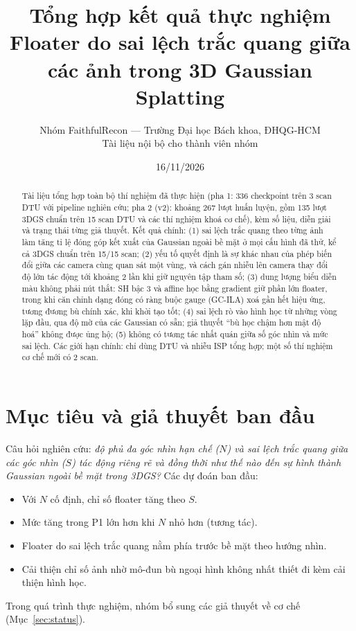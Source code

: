 \documentclass[11pt,a4paper]{article}
\title{\textbf{Tổng hợp kết quả thực nghiệm}\\[3pt]
\large Floater do sai lệch trắc quang giữa các ảnh trong 3D Gaussian Splatting}
\author{Nhóm FaithfulRecon --- Trường Đại học Bách khoa, ĐHQG-HCM\\
Tài liệu nội bộ cho thành viên nhóm}
\date{16/11/2026}
\begin{document}
\maketitle

\begin{abstract}
\noindent Tài liệu tổng hợp toàn bộ thí nghiệm đã thực hiện (pha 1: 336 checkpoint trên 3 scan DTU với pipeline nghiên cứu; pha 2 (v2): khoảng 267 lượt huấn luyện, gồm 135 lượt 3DGS chuẩn trên 15 scan DTU và các thí nghiệm khoá cơ chế), kèm số liệu, diễn giải và trạng thái từng giả thuyết. Kết quả chính: (1) sai lệch trắc quang theo từng ảnh làm tăng tỉ lệ đóng góp kết xuất của Gaussian ngoài bề mặt ở mọi cấu hình đã thử, kể cả 3DGS chuẩn trên 15/15 scan; (2) yếu tố quyết định là sự khác nhau của phép biến đổi giữa các camera cùng quan sát một vùng, và cách gán nhiễu lên camera thay đổi độ lớn tác động tới khoảng 2 lần khi giữ nguyên tập tham số; (3) dung lượng biểu diễn màu không phải nút thắt: SH bậc 3 và affine học bằng gradient giữ phần lớn floater, trong khi căn chỉnh dạng đóng có ràng buộc gauge (GC-ILA) xoá gần hết hiệu ứng, tương đương bù chính xác, khi khởi tạo tốt; (4) sai lệch rò vào hình học từ những vòng lặp đầu, qua độ mờ của các Gaussian có sẵn; giả thuyết ``bù học chậm hơn mật độ hoá'' không được ủng hộ; (5) không có tương tác nhất quán giữa số góc nhìn và mức sai lệch. Các giới hạn chính: chỉ dùng DTU và nhiễu ISP tổng hợp; một số thí nghiệm cơ chế mới có 2 scan.
\end{abstract}

\tableofcontents
\newpage

\section{Mục tiêu và giả thuyết ban đầu}
Câu hỏi nghiên cứu: \emph{độ phủ đa góc nhìn hạn chế ($N$) và sai lệch trắc quang giữa các góc nhìn ($S$) tác động riêng rẽ và đồng thời như thế nào đến sự hình thành Gaussian ngoài bề mặt trong 3DGS?} Các dự đoán ban đầu:
\begin{itemize}
  \item[\textbf{P1.}] Với $N$ cố định, chỉ số floater tăng theo $S$.
  \item[\textbf{P2.}] Mức tăng trong P1 lớn hơn khi $N$ nhỏ hơn (tương tác).
  \item[\textbf{P3.}] Floater do sai lệch trắc quang nằm phía trước bề mặt theo hướng nhìn.
  \item[\textbf{P4.}] Cải thiện chỉ số ảnh nhờ mô-đun bù ngoại hình không nhất thiết đi kèm cải thiện hình học.
\end{itemize}
Trong quá trình thực nghiệm, nhóm bổ sung các giả thuyết về cơ chế (Mục~\ref{sec:status}).
\end{document}
